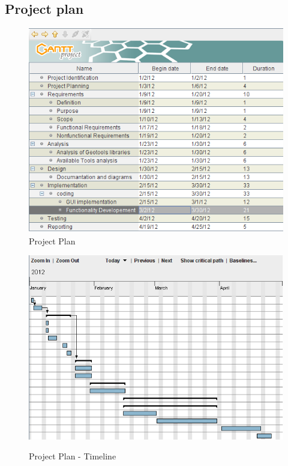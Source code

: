 \subsection{Project plan}
\begin{figure}[h]
\begin{center}
  \includegraphics[scale=0.85] {ProjectPlan1.png}
  \caption[Project Planning]{Project Plan}
\end{center}
\end{figure}
\begin{figure}[h]
\begin{center}
  \includegraphics[scale=0.8] {ProjectPlan2.png}\\
  \caption[Timeline]{Project Plan - Timeline}
\end{center}
\end{figure}


